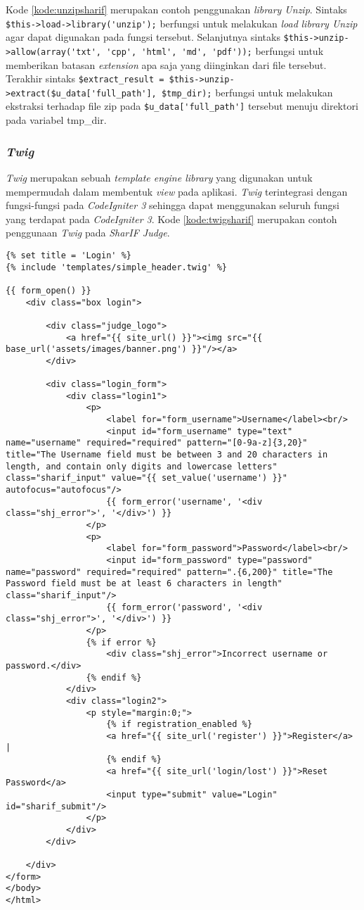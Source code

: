 Kode \ref{kode:unzipsharif} merupakan contoh penggunakan \textit{library Unzip}. Sintaks \verb|$this->load->library('unzip');| berfungsi untuk melakukan \textit{load} \textit{library Unzip} agar dapat digunakan pada fungsi tersebut. Selanjutnya sintaks \verb|$this->unzip->allow(array('txt', 'cpp', 'html', 'md', 'pdf'));| berfungsi untuk memberikan batasan \textit{extension} apa saja yang diinginkan dari file tersebut. Terakhir sintaks \verb|$extract_result = $this->unzip->extract($u_data['full_path'], $tmp_dir);| berfungsi untuk melakukan ekstraksi terhadap file zip pada \verb|$u_data['full_path']| tersebut menuju direktori pada variabel tmp\_dir.

\subsubsection{\textit{Twig}}
\textit{Twig} merupakan sebuah \textit{template engine library} yang digunakan untuk mempermudah dalam membentuk \textit{view} pada aplikasi. \textit{Twig} terintegrasi dengan fungsi-fungsi pada \textit{CodeIgniter 3} sehingga dapat menggunakan seluruh fungsi yang terdapat pada \textit{CodeIgniter 3}. Kode \ref{kode:twigsharif} merupakan contoh penggunaan \textit{Twig} pada \textit{SharIF Judge}.
\begin{lstlisting}[caption=Contoh \textit{view} menggunakan \textit{library Twig}, label=kode:twigsharif]
{% set title = 'Login' %}
{% include 'templates/simple_header.twig' %}

{{ form_open() }}
	<div class="box login">

		<div class="judge_logo">
			<a href="{{ site_url() }}"><img src="{{ base_url('assets/images/banner.png') }}"/></a>
		</div>

		<div class="login_form">
			<div class="login1">
				<p>
					<label for="form_username">Username</label><br/>
					<input id="form_username" type="text" name="username" required="required" pattern="[0-9a-z]{3,20}" title="The Username field must be between 3 and 20 characters in length, and contain only digits and lowercase letters" class="sharif_input" value="{{ set_value('username') }}" autofocus="autofocus"/>
					{{ form_error('username', '<div class="shj_error">', '</div>') }}
				</p>
				<p>
					<label for="form_password">Password</label><br/>
					<input id="form_password" type="password" name="password" required="required" pattern=".{6,200}" title="The Password field must be at least 6 characters in length" class="sharif_input"/>
					{{ form_error('password', '<div class="shj_error">', '</div>') }}
				</p>
				{% if error %}
					<div class="shj_error">Incorrect username or password.</div>
				{% endif %}
			</div>
			<div class="login2">
				<p style="margin:0;">
					{% if registration_enabled %}
					<a href="{{ site_url('register') }}">Register</a> |
					{% endif %}
					<a href="{{ site_url('login/lost') }}">Reset Password</a>
					<input type="submit" value="Login" id="sharif_submit"/>
				</p>
			</div>
		</div>

	</div>
</form>
</body>
</html>
\end{lstlisting}

